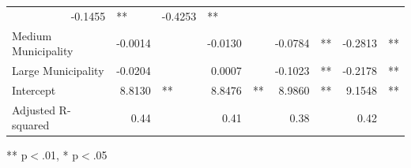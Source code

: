 \documentclass[12pt]{article}
\begin{document}
\begin{table}[!h]
\begin{tabular}{lllllllll}
  \multicolumn{1}{r}{-0.1455} &
  \multicolumn{1}{l}{**} &
  \multicolumn{1}{r}{-0.4253} &
  \multicolumn{1}{l}{**} \\
\multicolumn{1}{l}{Medium Municipality} &
  \multicolumn{1}{r}{-0.0014} &
  \multicolumn{1}{l}{} &
  \multicolumn{1}{r}{-0.0130} &
  \multicolumn{1}{l}{} &
  \multicolumn{1}{r}{-0.0784} &
  \multicolumn{1}{l}{**} &
  \multicolumn{1}{r}{-0.2813} &
  \multicolumn{1}{l}{**} \\
\multicolumn{1}{l}{Large Municipality} &
  \multicolumn{1}{r}{-0.0204} &
  \multicolumn{1}{l}{} &
  \multicolumn{1}{r}{0.0007} &
  \multicolumn{1}{l}{} &
  \multicolumn{1}{r}{-0.1023} &
  \multicolumn{1}{l}{**} &
  \multicolumn{1}{r}{-0.2178} &
  \multicolumn{1}{l}{**} \\
\multicolumn{1}{l}{Intercept} &
  \multicolumn{1}{r}{8.8130} &
  \multicolumn{1}{l}{**} &
  \multicolumn{1}{r}{8.8476} &
  \multicolumn{1}{l}{**} &
  \multicolumn{1}{r}{8.9860} &
  \multicolumn{1}{l}{**} &
  \multicolumn{1}{r}{9.1548} &
  \multicolumn{1}{l}{**} \\
\multicolumn{1}{l}{Adjusted R-squared} &
  \multicolumn{1}{r}{0.44} &
  \multicolumn{1}{l}{} &
  \multicolumn{1}{r}{0.41} &
  \multicolumn{1}{l}{} &
  \multicolumn{1}{r}{0.38} &
  \multicolumn{1}{l}{} &
  \multicolumn{1}{r}{0.42} &
  \multicolumn{1}{l}{} \\
\cline{1-9}
\end{tabular}

\footnotesize{
** p$<$.01, * p$<$.05
}
\end{table}
\end{document}
